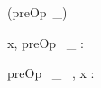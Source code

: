\begin{zed}
\generic (preOp~\_)
\end{zed}

\begin{axdef}
  x, preOp~ \_ : \nat \fun \nat
\end{axdef}

\begin{axdef}
  preOp~ \_ ~, x : \nat \fun \nat
\end{axdef}
